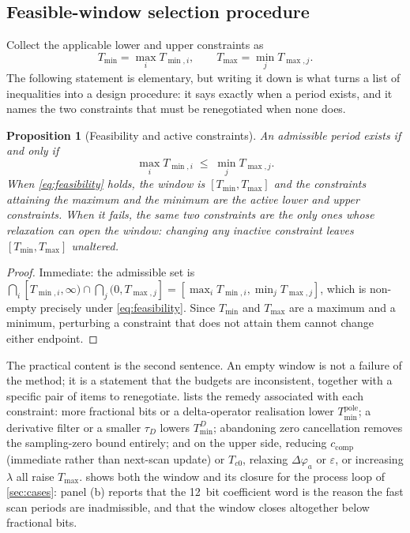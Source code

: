 \documentclass[a4paper,fleqn]{cas-sc}
\newtheorem{proposition}{Proposition}
\theoremstyle{remark}
\newcommand{\Tmin}{T_{\min}}
\newcommand{\Tmax}{T_{\max}}
\begin{document}
\subsection{Feasible-window selection procedure}
\label{sec:algorithm}
Collect the applicable lower and upper constraints as
\begin{equation}
\Tmin=\max_i T_{\min,i},\qquad
\Tmax=\min_j T_{\max,j}.
\label{eq:window}
\end{equation}
The following statement is elementary, but writing it down is what turns a
list of inequalities into a design procedure: it says exactly when a period
exists, and it names the two constraints that must be renegotiated when none
does.
\begin{proposition}[Feasibility and active constraints]
\label{prop:feasible}
An admissible period exists if and only if
\begin{equation}
\max_i T_{\min,i}\;\leq\;\min_j T_{\max,j}.
\label{eq:feasibility}
\end{equation}
When \cref{eq:feasibility} holds, the window is
$[\Tmin,\Tmax]$ and the constraints attaining the maximum and the minimum are
the \emph{active} lower and upper constraints. When it fails, the same two
constraints are the only ones whose relaxation can open the window: changing
any inactive constraint leaves $[\Tmin,\Tmax]$ unaltered.
\end{proposition}
\begin{proof}
Immediate: the admissible set is $\bigcap_i[T_{\min,i},\infty)\cap
\bigcap_j(0,T_{\max,j}]=[\max_iT_{\min,i},\min_jT_{\max,j}]$, which is
non-empty precisely under \cref{eq:feasibility}. Since $\Tmin$ and $\Tmax$
are a maximum and a minimum, perturbing a constraint that does not attain
them cannot change either endpoint.
\end{proof}

The practical content is the second sentence. An empty window is not a
failure of the method; it is a statement that the budgets are inconsistent,
together with a specific pair of items to renegotiate. 
lists the remedy associated with each constraint: more fractional bits or a
delta-operator realisation lower $\Tmin^{\mathrm{pole}}$; a derivative filter
or a smaller $\tau_D$ lowers $\Tmin^{D}$; abandoning zero cancellation
removes the sampling-zero bound entirely; and on the upper side, reducing
$c_{\mathrm{comp}}$ (immediate rather than next-scan update) or $T_{c0}$,
relaxing $\Delta\varphi_a$ or $\varepsilon$, or increasing $\lambda$ all
raise $\Tmax$.  shows both the window and its closure for
the process loop of \cref{sec:cases}: panel (b) reports that the
\SI{12}{bit} coefficient word is the reason the fast scan periods are
inadmissible, and that the window closes altogether below
\WindowOpensBits{} fractional bits.
\end{document}
